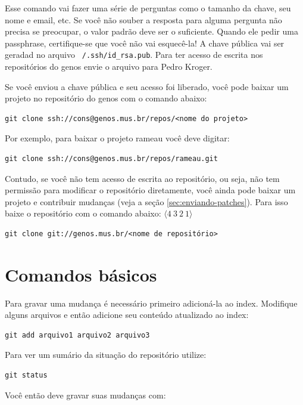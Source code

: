 \documentclass[12pt,brazil]{book}
\begin{document}
Esse comando vai fazer uma série de perguntas como o tamanho da chave,
seu nome e email, etc. Se você não souber a resposta para alguma
pergunta não precisa se preocupar, o valor padrão deve ser o
suficiente. Quando ele pedir uma passphrase, certifique-se que você
não vai esquecê-la! A chave pública vai ser geradad no arquivo
\texttt{~/.ssh/id\_rsa.pub}. Para ter acesso de escrita nos
repositórios do genos envie o arquivo para Pedro Kroger.

Se você enviou a chave pública e seu acesso foi liberado, você pode
baixar um projeto no repositório do genos com o comando abaixo:

\begin{verbatim}
git clone ssh://cons@genos.mus.br/repos/<nome do projeto>
\end{verbatim}

Por exemplo, para baixar o projeto rameau você deve
digitar:

\begin{verbatim}
git clone ssh://cons@genos.mus.br/repos/rameau.git
\end{verbatim}

Contudo, se você não tem acesso de escrita ao repositório, ou seja,
não tem permissão para modificar o repositório diretamente, você ainda
pode baixar um projeto e contribuir mudanças (veja a seção
\ref{sec:enviando-patches}). Para isso baixe o repositório com o
comando abaixo:
$\langle 4 \: 3\:  2\: 1 \rangle$
\begin{verbatim}
git clone git://genos.mus.br/<nome de repositório>
\end{verbatim}

\section{Comandos básicos}
\label{sec:comandos-basicos}

Para gravar uma mudança é necessário primeiro adicioná-la ao
index. Modifique alguns arquivos e então adicione seu conteúdo
atualizado ao index:

\begin{verbatim}
git add arquivo1 arquivo2 arquivo3
\end{verbatim}

Para ver um sumário da situação do repositório utilize:

\begin{verbatim}
git status
\end{verbatim}

Você então deve gravar suas mudanças com:
\end{document}
